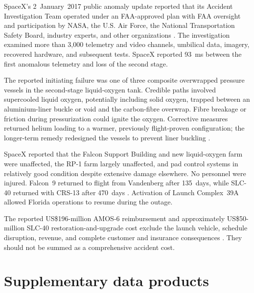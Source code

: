 \documentclass[]{seismica}
\begin{document}
SpaceX's 2~January~2017 public anomaly update reported that its Accident
Investigation Team operated under an FAA-approved plan with FAA oversight and
participation by NASA, the U.S. Air Force, the National Transportation Safety
Board, industry experts, and other organizations
\citep{spacex_anomaly_2017,nasa_sma_falcon9}. The investigation examined more
than 3,000 telemetry and video channels, umbilical data, imagery, recovered
hardware, and subsequent tests. SpaceX reported 93~ms between the first
anomalous telemetry and loss of the second stage.

The reported initiating failure was one of three composite overwrapped pressure
vessels in the second-stage liquid-oxygen tank. Credible paths involved
supercooled liquid oxygen, potentially including solid oxygen, trapped between
an aluminium-liner buckle or void and the carbon-fibre overwrap. Fibre breakage
or friction during pressurization could ignite the oxygen. Corrective measures
returned helium loading to a warmer, previously flight-proven configuration;
the longer-term remedy redesigned the vessels to prevent liner buckling
\citep{spacex_anomaly_2017}.

SpaceX reported that the Falcon Support Building and new liquid-oxygen farm
were unaffected, the RP-1 farm largely unaffected, and pad control systems in
relatively good condition despite extensive damage elsewhere. No personnel
were injured. Falcon~9 returned to flight from Vandenberg after 135~days, while
SLC-40 returned with CRS-13 after 470~days
\citep{spacex_iridium1_2017,spacex_crs13_2017}. Activation of Launch
Complex~39A allowed Florida operations to resume during the outage.

The reported US\$196-million AMOS-6 reimbursement and approximately
US\$50-million SLC-40 restoration-and-upgrade cost exclude the launch vehicle,
schedule disruption, revenue, and complete customer and insurance consequences
\citep{magan_amos6_2016,clark_slc40_2017}. They should not be summed as a
comprehensive accident cost.

\section{Supplementary data products}
\end{document}
